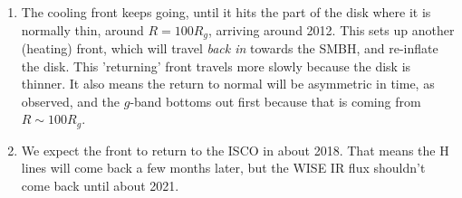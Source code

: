\documentclass[11pt,a4paper]{article}
\begin{document}
\begin{enumerate}
\item The cooling front keeps going, until it hits the part of the
disk where it is normally thin, around $R=100 R_g$, arriving around
2012. This sets up another (heating) front, which will travel {\it
back in} towards the SMBH, and re-inflate the disk. This 'returning'
front travels more slowly because the disk is thinner. It also means
the return to normal will be asymmetric in time, as observed, and the
$g$-band bottoms out first because that is coming from
$R\sim100R_{g}$.

\item We expect the front to return to the ISCO in about 2018. That
means the H lines will come back a few months later, but the WISE IR
flux shouldn't come back until about 2021.

\end{enumerate}


\newpage
\end{document}
